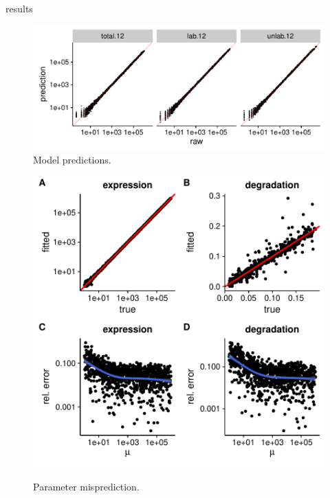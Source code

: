 results
\begin{figure}
 \includegraphics[width=\linewidth]{fig/predictions}
 \caption{Model predictions.}
\end{figure}

\begin{figure}
 \includegraphics[width=\linewidth]{fig/parameters}\\
 \caption{Parameter misprediction.}
\end{figure}